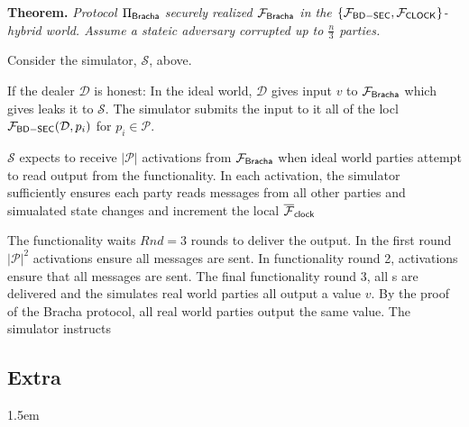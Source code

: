 \documentclass[11pt]{article}
\begin{document}
{\bf Theorem.} {\em Protocol $\Pi_{{\mathsf {Bracha}}}$ securely realized $\mathcal{F}_{{\mathsf {Bracha}}}$ in the $\{\mathcal{F}_{{\mathsf {BD-SEC}}},\mathcal{F}_{{\mathsf {CLOCK}}}\}$-hybrid world. Assume a stateic adversary corrupted up to $\frac{n}{3}$ parties.}

Consider the simulator, $\mathcal{S}$, above.

If the dealer $\mathcal{D}$ is honest: In the ideal world, $\mathcal{D}$ gives input $v$ to $\mathcal{F}_{{\mathsf {Bracha}}}$ which gives leaks it to $\mathcal{S}$.
The simulator submits the input to it all of the locl $\mathcal{F}_{{\mathsf {BD-SEC}}}(\mathcal{D},p_i)$ for $p_i \in  \mathcal{P}$.

$\mathcal{S}$ expects to receive $|\mathcal{P}|$ activations from $\mathcal{F}_{{\mathsf {Bracha}}}$ when ideal world parties attempt to read output from the functionality.
In each activation, the simulator sufficiently ensures each party reads messages from all other parties and simualated state changes and increment the local $\overline{\mathcal{F}}_{{\mathsf {clock}}}$

The functionality waits $Rnd = 3$ rounds to deliver the output. In the first round $|\mathcal{P}|^2$ activations ensure all  messages are sent.
In functionality round 2, activations ensure that all  messages are sent. The final functionality round 3, all s are delivered and the simulates real world parties all output a value $v$.
By the proof of the Bracha protocol, all real world parties output the same value. The simulator instructs 
\subsection{Extra}

\begin{figure}
	
\end{figure}

\begin{figure}
	
\end{figure}




\emergencystretch 1.5em

\end{document}

